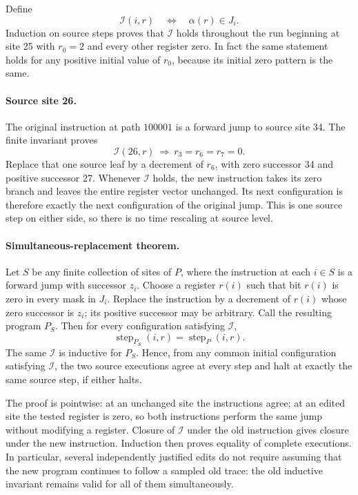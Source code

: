 Define
\[
 \mathcal I(i,r)\quad\Longleftrightarrow\quad\alpha(r)\in J_i.
\]
Induction on source steps proves that $\mathcal I$ holds throughout the
run beginning at site 25 with $r_0=2$ and every other register zero. In
fact the same statement holds for any positive initial value of $r_0$,
because its initial zero pattern is the same.

\paragraph{Source site 26.}
The original instruction at path $100001$ is a forward jump to source
site 34. The finite invariant proves
\[
 \mathcal I(26,r)\ \Longrightarrow\ r_3=r_6=r_7=0.
\]
Replace that one source leaf by a decrement of $r_6$, with zero successor
34 and positive successor 27. Whenever $\mathcal I$ holds, the new
instruction takes its zero branch and leaves the entire register vector
unchanged. Its next configuration is therefore exactly the next
configuration of the original jump. This is one source step on either
side, so there is no time rescaling at source level.

\paragraph{Simultaneous-replacement theorem.}
Let $S$ be any finite collection of sites of $P$, where the instruction at
each $i\in S$ is a forward jump with successor $z_i$. Choose a register
$r(i)$ such that bit $r(i)$ is zero in every mask in $J_i$. Replace the
instruction by a decrement of $r(i)$ whose zero successor is $z_i$; its
positive successor may be arbitrary. Call the resulting program $P_S$.
Then for every configuration satisfying $\mathcal I$,
\[
       \operatorname{step}_{P_S}(i,r)=\operatorname{step}_{P}(i,r).
\]
The same $\mathcal I$ is inductive for $P_S$. Hence, from any common
initial configuration satisfying $\mathcal I$, the two source executions
agree at every step and halt at exactly the same source step, if either
halts.

The proof is pointwise: at an unchanged site the instructions agree; at
an edited site the tested register is zero, so both instructions perform
the same jump without modifying a register. Closure of $\mathcal I$
under the old instruction gives closure under the new instruction.
Induction then proves equality of complete executions. In particular,
several independently justified edits do not require assuming that the
new program continues to follow a sampled old trace: the old inductive
invariant remains valid for all of them simultaneously.

